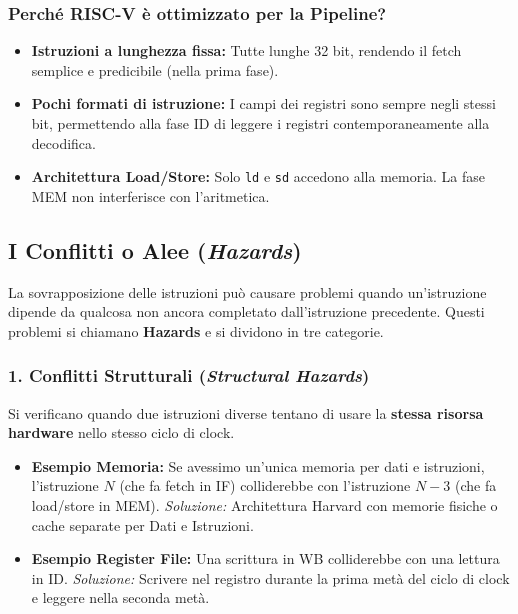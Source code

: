 \documentclass[12pt, a4paper]{article}
\begin{document}
\subsubsection{Perché RISC-V è ottimizzato per la Pipeline?}
\begin{itemize}
    \item \textbf{Istruzioni a lunghezza fissa:} Tutte lunghe 32 bit, rendendo il fetch semplice e predicibile (nella prima fase).
    \item \textbf{Pochi formati di istruzione:} I campi dei registri sono sempre negli stessi bit, permettendo alla fase ID di leggere i registri contemporaneamente alla decodifica.
    \item \textbf{Architettura Load/Store:} Solo \texttt{ld} e \texttt{sd} accedono alla memoria. La fase MEM non interferisce con l'aritmetica.
\end{itemize}

\subsection{I Conflitti o Alee (\textit{Hazards})}
La sovrapposizione delle istruzioni può causare problemi quando un'istruzione dipende da qualcosa non ancora completato dall'istruzione precedente. Questi problemi si chiamano \textbf{Hazards} e si dividono in tre categorie.

\subsubsection{1. Conflitti Strutturali (\textit{Structural Hazards})}
Si verificano quando due istruzioni diverse tentano di usare la \textbf{stessa risorsa hardware} nello stesso ciclo di clock.
\begin{itemize}
    \item \textbf{Esempio Memoria:} Se avessimo un'unica memoria per dati e istruzioni, l'istruzione $N$ (che fa fetch in IF) colliderebbe con l'istruzione $N-3$ (che fa load/store in MEM). \textit{Soluzione:} Architettura Harvard con memorie fisiche o cache separate per Dati e Istruzioni.
    \item \textbf{Esempio Register File:} Una scrittura in WB colliderebbe con una lettura in ID. \textit{Soluzione:} Scrivere nel registro durante la prima metà del ciclo di clock e leggere nella seconda metà.
\end{itemize}
\end{document}
